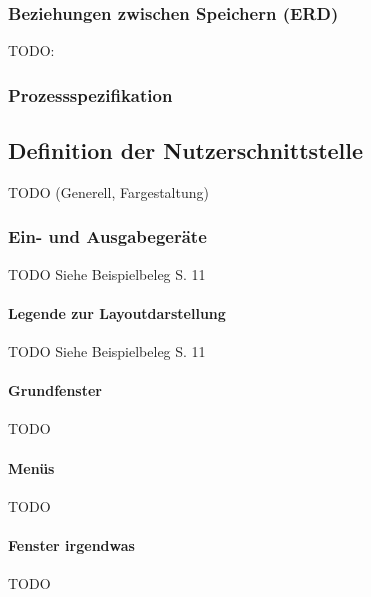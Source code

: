 \subsubsection{Beziehungen zwischen Speichern (ERD)}
TODO:

\subsubsection{Prozessspezifikation}






\subsection{Definition der Nutzerschnittstelle}
TODO (Generell, Fargestaltung)

\subsubsection{Ein- und Ausgabegeräte}
TODO Siehe Beispielbeleg S. 11

\paragraph{Legende zur Layoutdarstellung}
TODO Siehe Beispielbeleg S. 11

\paragraph{Grundfenster}
TODO

\paragraph{Menüs}
TODO

\paragraph{Fenster irgendwas}
TODO
